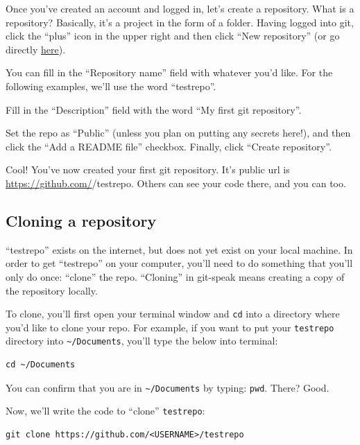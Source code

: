 \documentclass[
]{book}
\begin{document}
Once you've created an account and logged in, let's create a repository. What is a repository? Basically, it's a project in the form of a folder. Having logged into git, click the ``plus'' icon in the upper right and then click ``New repository'' (or go directly \href{https://github.com/new}{here}).

You can fill in the ``Repository name'' field with whatever you'd like. For the following examples, we'll use the word ``testrepo''.

Fill in the ``Description'' field with the word ``My first git repository''.

Set the repo as ``Public'' (unless you plan on putting any secrets here!), and then click the ``Add a README file'' checkbox. Finally, click ``Create repository''.

Cool! You've now created your first git repository. It's public url is \url{https://github.com/}/testrepo. Others can see your code there, and you can too.

\hypertarget{cloning-a-repository}{%
\subsection*{Cloning a repository}\label{cloning-a-repository}}

``testrepo'' exists on the internet, but does not yet exist on your local machine. In order to get ``testrepo'' on your computer, you'll need to do something that you'll only do once: ``clone'' the repo. ``Cloning'' in git-speak means creating a copy of the repository locally.

To clone, you'll first open your terminal window and \texttt{cd} into a directory where you'd like to clone your repo. For example, if you want to put your \texttt{testrepo} directory into \texttt{\textasciitilde{}/Documents}, you'll type the below into terminal:

\begin{verbatim}
cd ~/Documents
\end{verbatim}

You can confirm that you are in \texttt{\textasciitilde{}/Documents} by typing: \texttt{pwd}. There? Good.

Now, we'll write the code to ``clone'' \texttt{testrepo}:

\begin{verbatim}
git clone https://github.com/<USERNAME>/testrepo
\end{verbatim}
\end{document}
